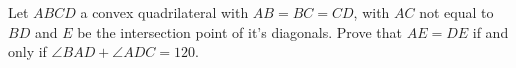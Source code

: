 Let $ABCD$ a convex quadrilateral with $AB=BC=CD$, with $AC$ not equal to $BD$ and $E$ be the intersection point of it's diagonals. Prove that $AE=DE$ if and only if $\angle BAD+\angle ADC = 120$.